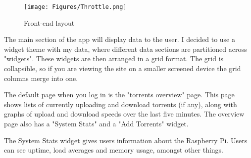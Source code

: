 \vspace{10px}
\begin{figure}[h!]
  \centering
    \texttt{[image: Figures/Throttle.png]}
  \caption{Front-end layout}
\end{figure}

The main section of the app will display data to the user. I decided to use a widget theme with my data, where different data sections are partitioned across "widgets". These widgets are then arranged in a grid format. The grid is collapsible, so if you are viewing the site on a smaller screened device the grid columns merge into one. 

The default page when you log in is the "torrents overview" page. This page shows lists of currently uploading and download torrents (if any), along with graphs of upload and download speeds over the last five minutes. The overview page also has a "System Stats" and a "Add Torrents" widget.

The System Stats widget gives users information about the Raspberry Pi. Users can see uptime, load averages and memory usage, amongst other things.
























